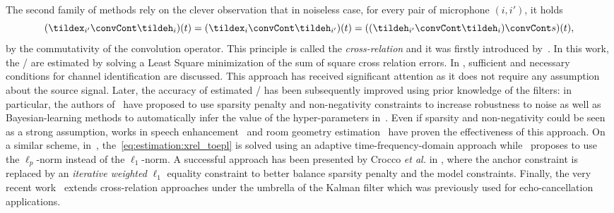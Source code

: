 \mynewline
The second family of methods rely on the clever observation that in noiseless case, for every pair of microphone $(i, i')$, it holds
\begin{equation}\label{eq:estimation:xrel_toepl}
    (\tildex_{i'} \convCont \tildeh_i)(t) = (\tildex_{i} \convCont \tildeh_{i'})(t) =  ((\tildeh_{i'} \convCont \tildeh_i) \convCont s)(t)
    ,
\end{equation}
by the commutativity of the convolution operator.
This principle is called the \textit{cross-relation} and it was firstly introduced by~.
In this work, the \RIR/ are estimated by solving a Least Square minimization of the sum of square cross relation errors.
In , sufficient and necessary conditions for channel identification are discussed.
This approach has received significant attention as it does not require any assumption about the source signal.
Later, the accuracy of estimated \RIRs/ has been subsequently improved using prior knowledge of the filters:
in particular, the authors of~ have proposed to use sparsity penalty and non-negativity constraints to increase robustness to noise as well as Bayesian-learning methods to automatically infer the value of the hyper-parameters in~.
Even if sparsity and non-negativity could be seen as a strong assumption, works in speech enhancement~ and room geometry estimation~ have proven the effectiveness of this approach.
On a similar scheme, in~, the~\eqref{eq:estimation:xrel_toepl} is solved using an adaptive time-frequency-domain approach while~ proposes to use the $\ell_p$-norm instead of the $\ell_1$-norm.
A successful approach has been presented by Crocco \textit{et al.} in , where the anchor constraint is replaced by an \textit{iterative weighted} $\ell_1$ equality constraint to better balance sparsity penalty and the model constraints.
Finally, the very recent work~ extends cross-relation approaches under the umbrella of the Kalman filter which was previously used for echo-cancellation applications.

